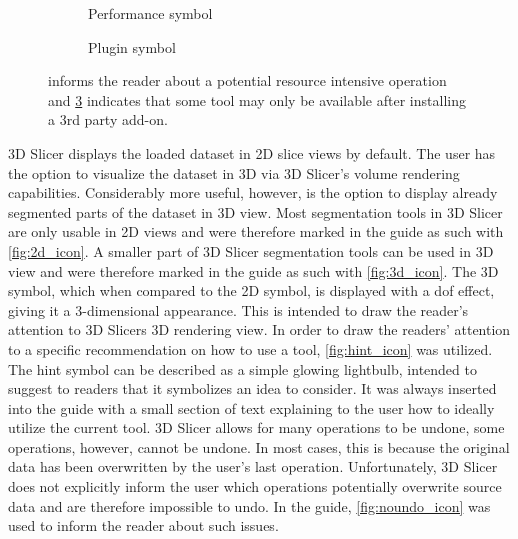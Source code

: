 \begin{figure}[h!]
	\begin{centering}
		\begin{subfigure}{0.5\textwidth}
			
			\caption{Performance symbol}\label{fig:performance_icon}
		\end{subfigure}
		\begin{subfigure}{0.5\textwidth}
			
			\caption{Plugin symbol}\label{fig:plugin_icon}
		\end{subfigure}
	\end{centering}
	\caption{ informs the reader about a potential resource intensive operation and \cref{fig:plugin_icon} indicates that some tool may only be available after installing a 3rd party add-on.}
\end{figure}
\par\medskip
\noindent
3D Slicer displays the loaded dataset in 2D slice views by default.
The user has the option to visualize the dataset in 3D via 3D Slicer's volume rendering capabilities.
Considerably more useful, however, is the option to display already segmented parts of the dataset in 3D view.
Most segmentation tools in 3D Slicer are only usable in 2D views and were therefore marked in the guide as such with \cref{fig:2d_icon}.
A smaller part of 3D Slicer segmentation tools can be used in 3D view and were therefore marked in the guide as such with \cref{fig:3d_icon}.
The 3D symbol, which when compared to the 2D symbol, is displayed with a \acrfull{dof} effect, giving it a 3-dimensional appearance.
This is intended to draw the reader's attention to 3D Slicers 3D rendering view.
In order to draw the readers' attention to a specific recommendation on how to use a tool, \cref{fig:hint_icon} was utilized.
The hint symbol can be described as a simple glowing lightbulb, intended to suggest to readers that it symbolizes an idea to consider.
It was always inserted into the guide with a small section of text explaining to the user how to ideally utilize the current tool.
3D Slicer allows for many operations to be undone, some operations, however, cannot be undone.
In most cases, this is because the original data has been overwritten by the user's last operation.
Unfortunately, 3D Slicer does not explicitly inform the user which operations potentially overwrite source data and are therefore impossible to undo.
In the guide, \cref{fig:noundo_icon} was used to inform the reader about such issues.
